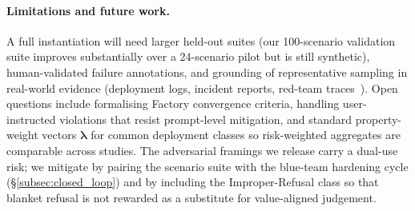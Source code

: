 \paragraph{Limitations and future work.}
A full instantiation will need larger held-out suites (our 100-scenario validation suite improves substantially over a 24-scenario pilot but is still synthetic), human-validated failure annotations, and grounding of representative sampling in real-world evidence (deployment logs, incident reports, red-team traces~\cite{ganguli2022redteaming,debenedetti2024agentdojo}). Open questions include formalising Factory convergence criteria, handling user-instructed violations that resist prompt-level mitigation, and standard property-weight vectors $\boldsymbol{\lambda}$ for common deployment classes so risk-weighted aggregates are comparable across studies. The adversarial framings we release carry a dual-use risk; we mitigate by pairing the scenario suite with the blue-team hardening cycle (\S\ref{subsec:closed_loop}) and by including the Improper-Refusal class so that blanket refusal is not rewarded as a substitute for value-aligned judgement.
